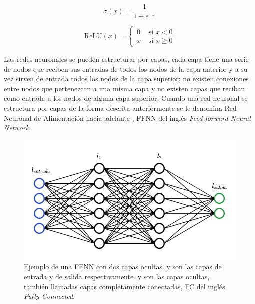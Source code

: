 \begin{equation}
    \label{eq:sigmoid}
    \sigma(x) = \frac{1}{1 + e^{-x}}
\end{equation}

\begin{equation}
    \label{eq:relu}
    \mathrm{ReLU}(x)= \begin{cases} 
        0 & \text { si } x<0 \\
        x & \text { si } x \geq 0
    \end{cases}
\end{equation}

Las redes neuronales se pueden estructurar por capas, cada capa tiene una serie de nodos que reciben sus entradas de todos los nodos de la capa anterior y a su vez sirven de entrada todos los nodos de la capa superior; no existen conexiones entre nodos que pertenezcan a una misma capa y no existen capas que reciban como entrada a los nodos de alguna capa superior. Cuando una red neuronal se estructura por capas de la forma descrita anteriormente se le denomina Red Neuronal de Alimentación hacia adelante \cite{huang2019deep}, FFNN del inglés \textit{Feed-forward Neural Network}. 

\begin{figure}[H]
    \centering
    \includegraphics[scale=0.4]{partes/img/nn-capas.png}
    \caption[Ejemplo de una FFNN con dos capas ocultas.]{
        Ejemplo de una FFNN con dos capas ocultas\footnotemark.  y  son las capas de entrada y de salida respectivamente.  y  son las capas ocultas, también llamadas capas completamente conectadas, FC del inglés \textit{Fully Connected}.
    } 
    \label{fig:nn-layers}
\end{figure}



